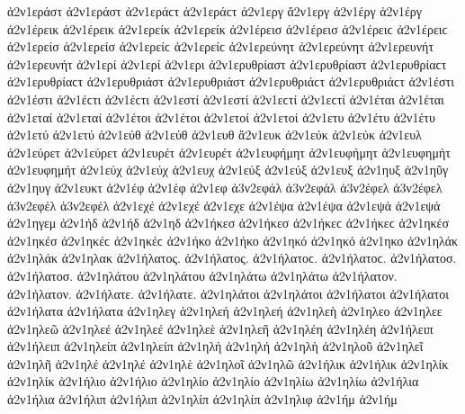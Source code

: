 {ἀ2ν1εράστ ἀ2ν1εράστ ἀ2ν1εράϲτ ἀ2ν1εράϲτ 
ἀ2ν1εργ   %
ἄ2ν1εργ   %
ἀ2ν1έργ ἀ2ν1έργ 
ἀ2ν1έρεικ ἀ2ν1έρεικ   %
ἀ2ν1ερείκ ἀ2ν1ερείκ 
ἀ2ν1έρεισ ἀ2ν1έρεισ ἀ2ν1έρειϲ ἀ2ν1έρειϲ   %
ἀ2ν1ερείσ ἀ2ν1ερείσ ἀ2ν1ερείϲ ἀ2ν1ερείϲ 
ἀ2ν1ερεύνητ ἀ2ν1ερεύνητ   %
ἀ2ν1ερευνήτ ἀ2ν1ερευνήτ 
ἀ2ν1ερί ἀ2ν1ερί   %
ἀ2ν1ερι 
ἀ2ν1ερυθρίαστ ἀ2ν1ερυθρίαστ ἀ2ν1ερυθρίαϲτ ἀ2ν1ερυθρίαϲτ   %
ἀ2ν1ερυθριάστ ἀ2ν1ερυθριάστ ἀ2ν1ερυθριάϲτ ἀ2ν1ερυθριάϲτ 
ἀ2ν1έστι ἀ2ν1έστι ἀ2ν1έϲτι ἀ2ν1έϲτι   %
ἀ2ν1εστί ἀ2ν1εστί ἀ2ν1εϲτί ἀ2ν1εϲτί 
ἀ2ν1έται ἀ2ν1έται   %
ἀ2ν1εταί ἀ2ν1εταί 
ἀ2ν1έτοι ἀ2ν1έτοι   %
ἀ2ν1ετοί ἀ2ν1ετοί 
ἀ2ν1ετυ   %
ἀ2ν1έτυ ἀ2ν1έτυ   %
ἀ2ν1ετύ ἀ2ν1ετύ 
ἀ2ν1εύθ ἀ2ν1εύθ   %
ἀ2ν1ευθ 
ἄ2ν1ευκ   %
ἀ2ν1εύκ ἀ2ν1εύκ 
ἀ2ν1ευλ   %
ἀ2ν1εύρετ ἀ2ν1εύρετ   %
ἀ2ν1ευρέτ ἀ2ν1ευρέτ 
ἀ2ν1ευφήμητ ἀ2ν1ευφήμητ   %
ἀ2ν1ευφημήτ ἀ2ν1ευφημήτ 
ἀ2ν1εύχ ἀ2ν1εύχ   %
ἀ2ν1ευχ 
ἀ2ν1εύξ ἀ2ν1εύξ   %
ἀ2ν1ευξ 
ἀ2ν1ηυξ   %
ἀ2ν1ηῦγ   %
ἀ2ν1ηυγ 
ἀ2ν1ευκτ   %
ἀ2ν1έφ ἀ2ν1έφ   %
ἀ2ν1εφ 
ἀ3ν2εφάλ ἀ3ν2εφάλ   %
ἀ3ν2έφελ ἀ3ν2έφελ   %
ἀ3ν2εφέλ ἀ3ν2εφέλ 
ἀ2ν1εχέ ἀ2ν1εχέ   %
ἀ2ν1εχε 
ἀ2ν1έψα ἀ2ν1έψα   %
ἀ2ν1εψά ἀ2ν1εψά 
ἀ2ν1ηγεμ   %
ἀ2ν1ήδ ἀ2ν1ήδ   %
ἀ2ν1ηδ 
ἀ2ν1ήκεσ ἀ2ν1ήκεσ ἀ2ν1ήκεϲ ἀ2ν1ήκεϲ   %
ἀ2ν1ηκέσ ἀ2ν1ηκέσ ἀ2ν1ηκέϲ ἀ2ν1ηκέϲ 
ἀ2ν1ήκο ἀ2ν1ήκο   %
ἀ2ν1ηκό ἀ2ν1ηκό 
ἀ2ν1ηκο 
ἀ2ν1ηλάκ ἀ2ν1ηλάκ   %
ἀ2ν1ηλακ 
ἀ2ν1ήλατος. ἀ2ν1ήλατος. ἀ2ν1ήλατοϲ. ἀ2ν1ήλατοϲ.   %
ἀ2ν1ήλατοσ. ἀ2ν1ήλατοσ. 
ἀ2ν1ηλάτου ἀ2ν1ηλάτου 
ἀ2ν1ηλάτω ἀ2ν1ηλάτω 
ἀ2ν1ήλατον. ἀ2ν1ήλατον. 
ἀ2ν1ήλατε. ἀ2ν1ήλατε. 
ἀ2ν1ηλάτοι ἀ2ν1ηλάτοι 
ἀ2ν1ήλατοι ἀ2ν1ήλατοι 
ἀ2ν1ήλατα ἀ2ν1ήλατα 
ἀ2ν1ηλεγ   %
ἀ2ν1ηλεή ἀ2ν1ηλεή   %
ἀ2ν1ηλεὴ 
ἀ2ν1ηλεο 
ἀ2ν1ηλεε 
ἀ2ν1ηλεῶ 
ἀ2ν1ηλεέ ἀ2ν1ηλεέ 
ἀ2ν1ηλεὲ 
ἀ2ν1ηλεῆ 
ἀ2ν1ηλέη ἀ2ν1ηλέη   %
ἀ2ν1ήλειπ ἀ2ν1ήλειπ   %
ἀ2ν1ηλείπ ἀ2ν1ηλείπ 
ἀ2ν1ηλή ἀ2ν1ηλή   %
ἀ2ν1ηλὴ 
ἀ2ν1ηλοῦ 
ἀ2ν1ηλεῖ 
ἀ2ν1ηλῆ 
ἀ2ν1ηλέ ἀ2ν1ηλέ 
ἀ2ν1ηλὲ 
ἀ2ν1ηλοῖ 
ἀ2ν1ηλῶ 
ἀ2ν1ήλικ ἀ2ν1ήλικ   %
ἀ2ν1ηλίκ ἀ2ν1ηλίκ 
ἀ2ν1ήλιο ἀ2ν1ήλιο   %
ἀ2ν1ηλίο ἀ2ν1ηλίο 
ἀ2ν1ηλίω ἀ2ν1ηλίω 
ἀ2ν1ήλια ἀ2ν1ήλια 
ἀ2ν1ήλιπ ἀ2ν1ήλιπ   %
ἀ2ν1ηλίπ ἀ2ν1ηλίπ 
ἀ2ν1ηλιφ   %
ἀ2ν1ήμ ἀ2ν1ήμ   %
}

